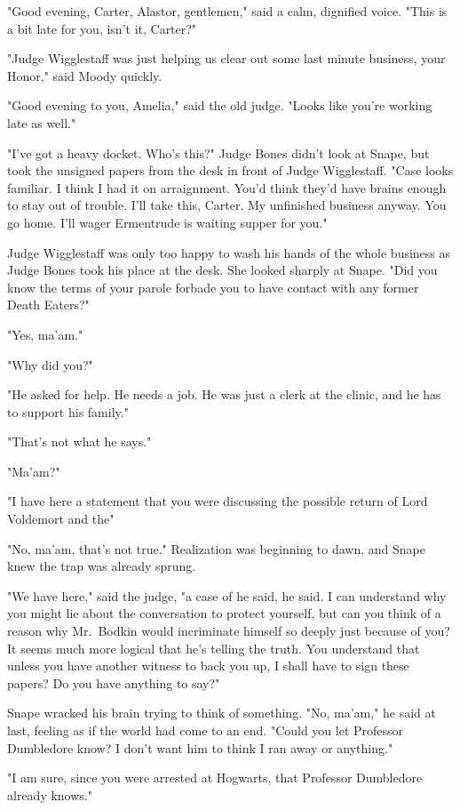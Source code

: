 "Good evening, Carter, Alastor, gentlemen," said a calm, dignified voice. "This is a bit late for you, isn't it, Carter?"

"Judge Wigglestaff was just helping us clear out some last minute business, your Honor," said Moody quickly.

"Good evening to you, Amelia," said the old judge. "Looks like you're working late as well."

"I've got a heavy docket. Who's this?" Judge Bones didn't look at Snape, but took the unsigned papers from the desk in front of Judge Wigglestaff. "Case looks familiar. I think I had it on arraignment. You'd think they'd have brains enough to stay out of trouble. I'll take this, Carter. My unfinished business anyway. You go home. I'll wager Ermentrude is waiting supper for you."

Judge Wigglestaff was only too happy to wash his hands of the whole business as Judge Bones took his place at the desk. She looked sharply at Snape. "Did you know the terms of your parole forbade you to have contact with any former Death Eaters?"

"Yes, ma'am."

"Why did you?"

"He asked for help. He needs a job. He was just a clerk at the clinic, and he has to support his family."

"That's not what he says."

"Ma'am?"

"I have here a statement that you were discussing the possible return of Lord Voldemort and the{\el}"

"No, ma'am, that's not true." Realization was beginning to dawn, and Snape knew the trap was already sprung.

"We have here," said the judge, "a case of he said, he said. I can understand why you might lie about the conversation to protect yourself, but can you think of a reason why Mr.~Bodkin would incriminate himself so deeply just because of you? It seems much more logical that he's telling the truth. You understand that unless you have another witness to back you up, I shall have to sign these papers? Do you have anything to say?"

Snape wracked his brain trying to think of something. "No, ma'am," he said at last, feeling as if the world had come to an end. "Could you let Professor Dumbledore know? I don't want him to think I ran away or anything."

"I am sure, since you were arrested at Hogwarts, that Professor Dumbledore already knows."

